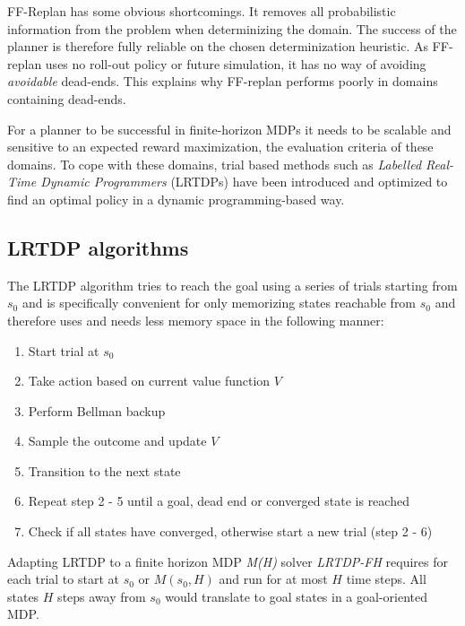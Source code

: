 \documentclass[runningheads,a4paper]{llncs}
\begin{document}
FF-Replan has some obvious shortcomings. It removes all probabilistic information from the problem when determinizing the domain. The success of the planner is therefore fully reliable on the chosen determinization heuristic. As FF-replan uses no roll-out policy or future simulation, it has no way of avoiding \emph{avoidable} dead-ends. This explains why FF-replan performs poorly in domains containing dead-ends. 

For a planner to be successful in finite-horizon MDPs it needs to be scalable and sensitive to an expected reward maximization, the evaluation criteria of these domains. To cope with these domains, trial based methods such as \emph{Labelled Real-Time Dynamic Programmers} (LRTDPs) have been introduced and optimized to find an optimal policy in a dynamic programming-based way.


\subsection{LRTDP algorithms}

The LRTDP algorithm tries to reach the goal using a series of trials starting from $s_0$ and is specifically convenient for only memorizing states reachable from $s_0$ and therefore uses and needs less memory space in the following manner:

\begin{enumerate}
	\item Start trial at $s_0$
	\item Take action based on current value function $V$
	\item Perform Bellman backup
	\item Sample the outcome and update $V$
	\item Transition to the next state
	\item Repeat step 2 - 5 until a goal, dead end or converged state is reached
	\item Check if all states have converged, otherwise start a new trial (step 2 - 6)
\end{enumerate}

Adapting LRTDP to a finite horizon MDP \emph{M(H)} solver \emph{LRTDP-FH} requires for each trial to start at $s_0$ or $M(s_0, H)$ and run for at most $H$ time steps. All states $H$ steps away from $s_0$ would translate to goal states in a goal-oriented MDP. \\
\end{document}
